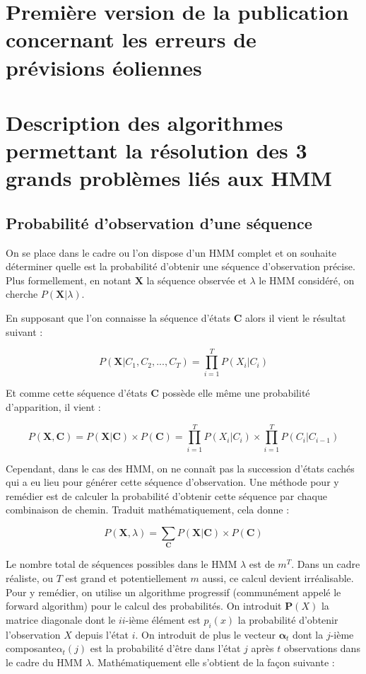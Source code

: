 \documentclass[12pt, french]{report}
\begin{document}
\appendix


\chapter{Première version de la publication concernant les erreurs de prévisions éoliennes}
\label{annex:ModelingWindPower}


\chapter{Description des algorithmes permettant la résolution des 3 grands problèmes liés aux HMM}
\label{annex:HMM_Algos}
\section{Probabilité d’observation d’une séquence}
On se place dans  le cadre ou l'on dispose d'un HMM complet et on souhaite déterminer quelle est la probabilité d'obtenir une séquence d'observation précise. Plus formellement, en notant $\bm{X}$ la séquence observée et $\lambda$ le HMM considéré, on cherche $P(\bm{X}|\lambda)$.

En supposant que l'on connaisse la séquence d'états $\bm{C}$ alors il vient le résultat suivant :

\begin{equation}
P(\bm{X}|C_1,C_2,...,C_T) = \prod\limits_{i=1}^T P(X_i|C_i)
\end{equation}

Et comme cette séquence d'états $\bm{C}$ possède elle même une probabilité d'apparition, il vient :

\begin{equation}
P(\bm{X},\bm{C}) = P(\bm{X}|\bm{C}) \times P(\bm{C}) =   \prod\limits_{i=1}^T P(X_i|C_i) \times \prod \limits_{i=1}^T P(C_i|C_{i-1})
\end{equation}

Cependant, dans le cas des HMM, on ne connaît pas la succession d'états cachés qui a eu lieu pour générer cette séquence d'observation. Une méthode pour y remédier est de calculer la probabilité d'obtenir cette séquence par chaque combinaison de chemin. Traduit mathématiquement, cela donne :

\begin{equation}
P(\bm{X},\lambda) =\sum\limits_{\bm{C}} P(\bm{X}|\bm{C}) \times P(\bm{C}) 
\end{equation}

Le nombre total de séquences possibles dans le HMM $\lambda$ est de $m^T$. Dans un cadre réaliste, ou $T$ est grand et potentiellement $m$ aussi, ce calcul devient irréalisable. Pour y remédier, on utilise un algorithme progressif (communément appelé le forward algorithm) pour le calcul des probabilités. On introduit $\bm{P}(X)$ la matrice diagonale dont le $ii$-ième élément est $p_i(x)$ la probabilité d'obtenir l'observation $X$ depuis l'état $i$. On introduit de plus le vecteur $\bm{\alpha}_t$ dont la $j$-ième composante$ \alpha_t(j)$ est la probabilité d'être dans l'état $j$ après $t$ observations dans le cadre du HMM $\lambda$. Mathématiquement elle s'obtient de la façon suivante : 
\end{document}
